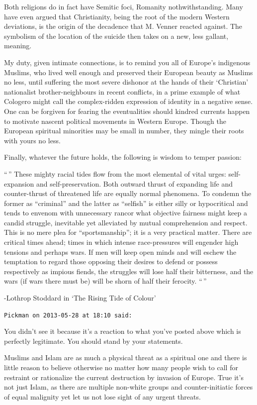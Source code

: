 \begin{footnotesize}
\begin{sffamily}
Both religions do in fact have Semitic foci, Romanity nothwithstanding. Many have even argued that Christianity, being the root of the modern Western deviations, is the origin of the decadence that M. Venner reacted against. The symbolism of the location of the suicide then takes on a new, less gallant, meaning.

My duty, given intimate connections, is to remind you all of Europe's indigenous Muslims, who lived well enough and preserved their European beauty as Muslims no less, until suffering the most severe dishonor at the hands of their `Christian' nationalist brother-neighbours in recent conflicts, in a prime example of what Cologero might call the complex-ridden expression of identity in a negative sense. One can be forgiven for fearing the eventualities should kindred currents happen to motivate nascent political movements in Western Europe. Though the European spiritual minorities may be small in number, they mingle their roots with yours no less.

Finally, whatever the future holds, the following is wisdom to temper passion:

``\,'' These mighty racial tides flow from the most elemental of vital urges: self-expansion and self-preservation. Both outward thrust of expanding life and counter-thrust of threatened life are equally normal phenomena. To condemn the former as ``criminal'' and the latter as ``selfish'' is either silly or hypocritical and tends to envenom with unnecessary rancor what objective fairness might keep a candid struggle, inevitable yet alleviated by mutual comprehension and respect. This is no mere plea for ``sportsmanship''; it is a very practical matter. There are critical times ahead; times in which intense race-pressures will engender high tensions and perhaps wars. If men will keep open minds and will eschew the temptation to regard those opposing their desires to defend or possess respectively as impious fiends, the struggles will lose half their bitterness, and the wars (if wars there must be) will be shorn of half their ferocity. ``\,''

-Lothrop Stoddard in `The Rising Tide of Colour'

\hfill

\texttt{Pickman on 2013-05-28 at 18:10 said:}

You didn't see it because it's a reaction to what you've posted above which is perfectly legitimate. You should stand by your statements.

Muslims and Islam are as much a physical threat as a spiritual one and there is little reason to believe otherwise no matter how many people wish to call for restraint or rationalize the current destruction by invasion of Europe. True it's not just Islam, as there are multiple non-white groups and counter-initiatic forces of equal malignity yet let us not lose sight of any urgent threats.


\end{sffamily}
\end{footnotesize}
